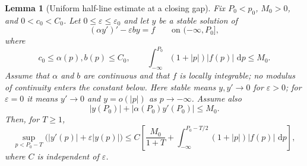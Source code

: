 \documentclass[11pt,reqno]{amsart}
\numberwithin{equation}{section}
\newtheorem{lemma}[theorem]{Lemma}
\newcommand{\dd}{\,\mathrm{d}}
\theoremstyle{definition}
\theoremstyle{remark}
\begin{document}
\begin{lemma}[Uniform half-line estimate at a closing gap]
\label{lem5dw:slow-resolvent}
Fix $P_0<p_0$, $M_0>0$, and $0<c_0<C_0$.  Let
$0\le\varepsilon\le\varepsilon_0$ and let $y$ be a stable solution of
\begin{equation}\label{eq5dw:abstract-slow}
 (\alpha y')'-\varepsilon b y=f\qquad\text{on }(-\infty,P_0],
\end{equation}
where
\[
 c_0\le\alpha(p),b(p)\le C_0,
 \qquad
 \int_{-\infty}^{P_0}(1+|p|)|f(p)|\,\dd p\le M_0.
\]
Assume that $\alpha$ and $b$ are continuous and that $f$ is locally
integrable; no modulus of continuity enters the constant below.
Here stable means $y,y'\to0$ for $\varepsilon>0$; for
$\varepsilon=0$ it means $y'\to0$ and $y=o(|p|)$ as
$p\to-\infty$.  Assume also
\[
 |y(P_0)|+|\alpha(P_0)y'(P_0)|\le M_0.
\]
Then, for $T\ge1$,
\begin{equation}\label{eq5dw:slow-resolvent-est}
 \sup_{p<P_0-T}\bigl(|y'(p)|+\varepsilon|y(p)|\bigr)
 \le C\left[
 \frac{M_0}{1+T}
 +\int_{-\infty}^{P_0-T/2}(1+|p|)|f(p)|\,\dd p\right],
\end{equation}
where $C$ is independent of $\varepsilon$.
\end{lemma}
\end{document}
